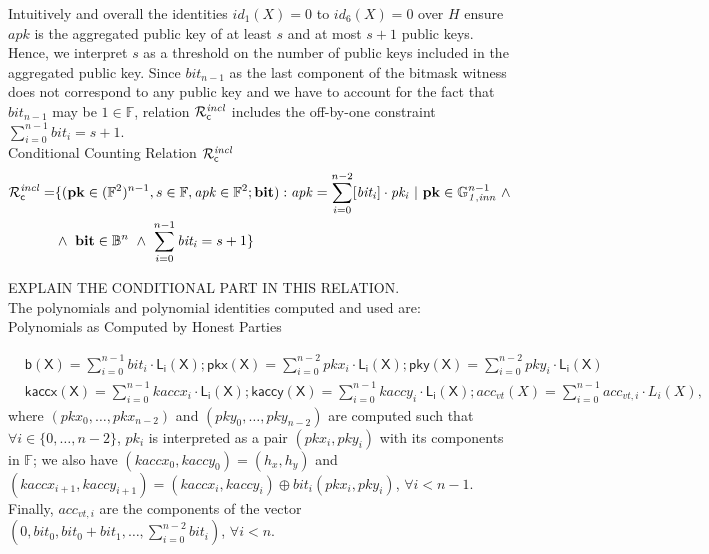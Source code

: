 \noindent Intuitively and overall the identities $id_1(X)=0$ to $id_6(X)=0$ over $H$ 
ensure $\mathit{apk}$ is the aggregated public key of at least $s$ and at most $s+1$ public keys. 
Hence, we interpret $s$ as a threshold on the number of public keys included in the aggregated public key. 
Since $\mathit{bit_{n-1}}$ as the last component of the bitmask witness does not correspond to any public 
key and we have to account for the fact that $\mathit{bit_{n-1}}$ may be 
$1 \in \mathbb{F}$, relation $\mathcal{R}^{\mathit{incl}}_{\mathsf{c}}$ includes the off-by-one constraint $\sum_{i=0}^{n-1} \mathit{bit_i} = s+1$.\\

\noindent \textsf{Conditional Counting Relation $\mathcal{R}^{\mathit{incl}}_{\mathsf{c}}$}  
\begin{equation*}
\begin{split}
 \Rvt = & \{(\mathbf{pk} \in (\mathbb{F}^2)^{n-1}, s \in \mathbb{F}, \mathit{apk} \in \mathbb{F}^2; \mathbf{bit}) : 
 \mathit{apk} = \sum_{i=0}^{n-2} [\mathit{bit_i}]  \cdot \mathit{pk_i} \ | \ \mathbf{pk}  \in \ginn{1}^{n-1} \ \wedge \\ 
& \wedge \ \mathbf{bit} \in \mathbb{B}^n \ \wedge \ \sum_{i=0}^{n-1} \mathit{bit_i} = s+1\} 
\end{split}
\end{equation*}

{\color{red} EXPLAIN THE CONDITIONAL PART IN THIS RELATION.} \\
\noindent The polynomials and polynomial identities computed and used are: \\

\noindent \textsf{Polynomials as Computed by Honest Parties} 

\begin{align*}
&\mathsf{b(X)} = \sum_{i=0}^{n-1} \mathit{bit_i} \cdot \mathsf{L_i(X)}; \mathsf{pkx(X)} =  \sum_{i=0}^{n-2} \mathit{pkx_i} \cdot \mathsf{L_i(X)}; 
\mathsf{pky(X)} =  \sum_{i=0}^{n-2} \mathit{pky_i} \cdot \mathsf{L_i(X)} \\
&\mathsf{kaccx(X)}  =  \sum_{i=0}^{n-1} \mathit{kaccx_i} \cdot \mathsf{L_i(X)}; \mathsf{kaccy(X)}  = \sum_{i=0}^{n-1} \mathit{kaccy_i} \cdot \mathsf{L_i(X)}; 
acc_{vt}(X)  = \sum_{i=0}^{n-1} acc_{vt,i} \cdot L_i(X),
\end{align*}
\noindent where $(\mathit{pkx_0}, \ldots, \mathit{pkx_{n-2}})$ 
and $(\mathit{pky_0}, \ldots, \mathit{pky_{n-2}})$ are computed such that $\forall i \in \{0, \ldots, n-2\}$, $\mathit{pk_i}$ 
is interpreted as a pair $(\mathit{pkx_i}, \mathit{pky_i})$ with its components in $\mathbb{F}$; we also have 
$(\mathit{kaccx_{0}}, \mathit{kaccy_{0}}) = (\mathit{h_x}, \mathit{h_y})$ and 
$(\mathit{kaccx_{i+1}}, \mathit{kaccy_{i+1}}) =  (\mathit{kaccx_{i}}, \mathit{kaccy_{i}}) \oplus \mathit{bit_i}(\mathit{pkx_{i}}, \mathit{pky_{i}})$, 
$\forall i < n-1$. Finally, $acc_{vt,i}$ are the components of the vector 
$(0, \mathit{bit_0}, \mathit{bit_0} + \mathit{bit_1}, \ldots, \sum_{i=0}^{n-2}\mathit{bit_i})$, $\forall i < n$. \\

